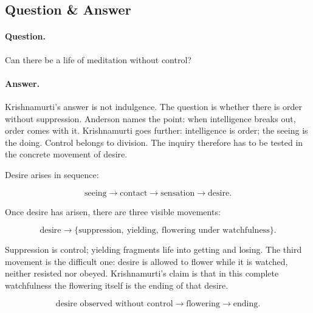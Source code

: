 \subsection{Question \& Answer}

\paragraph{Question.}
Can there be a life of meditation without control?

\paragraph{Answer.}
Krishnamurti's answer is not indulgence. The question is whether there is order without suppression. Anderson names the point: when intelligence breaks out, order comes with it. Krishnamurti goes further: intelligence is order; the seeing is the doing. Control belongs to division. The inquiry therefore has to be tested in the concrete movement of desire.

Desire arises in sequence:

\begin{equation}
\text{seeing}
\longrightarrow
\text{contact}
\longrightarrow
\text{sensation}
\longrightarrow
\text{desire}.
\end{equation}

Once desire has arisen, there are three visible movements:

\begin{equation}
\text{desire}
\longrightarrow
\{\text{suppression},\ \text{yielding},\ \text{flowering under watchfulness}\}.
\end{equation}

Suppression is control; yielding fragments life into getting and losing. The third movement is the difficult one: desire is allowed to flower while it is watched, neither resisted nor obeyed. Krishnamurti's claim is that in this complete watchfulness the flowering itself is the ending of that desire.

\begin{equation}
\text{desire observed without control}
\longrightarrow
\text{flowering}
\longrightarrow
\text{ending}.
\end{equation}

